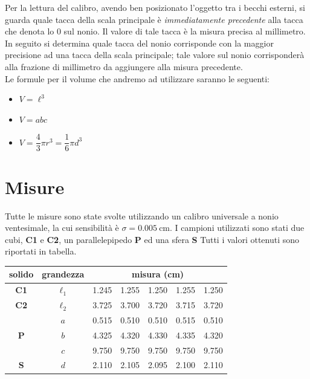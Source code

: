 \documentclass[12pt]{scrartcl}
\begin{document}
Per la lettura del calibro, avendo ben posizionato l'oggetto tra i becchi esterni,
si guarda quale tacca della scala principale è \emph{immediatamente precedente} alla
tacca che denota lo \(0\) sul nonio. Il valore di tale tacca è la misura precisa al
millimetro. In seguito si determina quale tacca del nonio corrisponde con la maggior
precisione ad una tacca della scala principale; tale valore sul nonio corrisponderà
alla frazione di millimetro da aggiungere alla misura precedente.\\[1em]
Le formule per il volume che andremo ad utilizzare saranno le seguenti:

\begin{itemize}
  \item {} \(V = \ell^3\)
  \item {} \(V = abc\)
  \item {} \(V = \dfrac{4}{3} \pi r^3 = \dfrac{1}{6} \pi d^3\)
\end{itemize}


\section{Misure}

Tutte le misure sono state svolte utilizzando un calibro universale a nonio ventesimale,
la cui sensibilità è \(\sigma = \SI{0.005}{\centi\metre}\). I campioni utilizzati sono
stati due cubi, \textbf{C1} e \textbf{C2}, un parallelepipedo \textbf{P} ed una
sfera \textbf{S} Tutti i valori ottenuti sono riportati in tabella.

\begin{center}\begin{tabular}{ccccccc}
  \toprule
  \textbf{solido} & \textbf{grandezza} & \multicolumn{5}{c}{\textbf{misura} (\si{\centi\metre})} \\
  \midrule
  \textbf{C1} & \(\ell_1\) & \num{1.245} & \num{1.255} & \num{1.250} & \num{1.255} & \num{1.250} \\
  \midrule
  \textbf{C2} & \(\ell_2\) & \num{3.725} & \num{3.700} & \num{3.720} & \num{3.715} & \num{3.720} \\
  \midrule
  \multirow{3}{*}{\textbf{P}} & \(a\) & \num{0.515} & \num{0.510} & \num{0.510} & \num{0.515} & \num{0.510} \\
                              & \(b\) & \num{4.325} & \num{4.320} & \num{4.330} & \num{4.335} & \num{4.320} \\
                              & \(c\) & \num{9.750} & \num{9.750} & \num{9.750} & \num{9.750} & \num{9.750} \\
  \midrule
  \textbf{S} & \(d\) & \num{2.110} & \num{2.105} & \num{2.095} & \num{2.100} & \num{2.110} \\
  \bottomrule
\end{tabular}\end{center}
\end{document}
